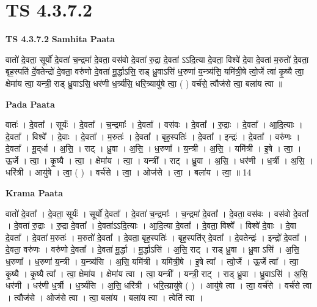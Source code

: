\documentclass[17pt]{extarticle}
\begin{document}
\section{ TS 4.3.7.2 }

\textbf{TS 4.3.7.2 } \newline
\textbf{Samhita Paata} \newline

वातो॑ दे॒वता॒ सूर्यो॑ दे॒वता॑ च॒न्द्रमा॑ दे॒वता॒ वस॑वो दे॒वता॑ रु॒द्रा दे॒वता॑ ऽऽदि॒त्या दे॒वता॒ विश्वे॑ दे॒वा दे॒वता॑ म॒रुतो॑ दे॒वता॒ बृह॒स्पति॑ र्दे॒वतेन्द्रो॑ दे॒वता॒ वरु॑णो दे॒वता॑ मू॒र्द्धाऽसि॒ राड् ध्रु॒वाऽसि॑ ध॒रुणा॑ य॒न्त्र्य॑सि॒ यमि॑त्री॒षे त्वो॒र्जे त्वा॑ कृ॒ष्यै त्वा॒ क्षेमा॑य त्वा॒ यन्त्री॒ राड् ध्रु॒वाऽसि॒ धर॑णी ध॒र्त्र्य॑सि॒ धरि॒त्र्यायु॑षे त्वा॒ ( ) वर्च॑से॒ त्वौज॑से त्वा॒ बला॑य त्वा ॥ \newline

\textbf{Pada Paata} \newline

वातः॑ । दे॒वता᳚ । सूर्यः॑ । दे॒वता᳚ । च॒न्द्रमाः᳚ । दे॒वता᳚ । वस॑वः । दे॒वता᳚ । रु॒द्राः । दे॒वता᳚ । आ॒दि॒त्याः । दे॒वता᳚ । विश्वे᳚ । दे॒वाः । दे॒वता᳚ । म॒रुतः॑ । दे॒वता᳚ । बृह॒स्पतिः॑ । दे॒वता᳚ । इन्द्रः॑ । दे॒वता᳚ । वरु॑णः । दे॒वता᳚ । मू॒द्‌र्धा । अ॒सि॒ । राट् । ध्रु॒वा । अ॒सि॒ । ध॒रुणा᳚ । य॒न्त्री । अ॒सि॒ । यमि॑त्री । इ॒षे । त्वा॒ । ऊ॒र्जे । त्वा॒ । कृ॒ष्यै । त्वा॒ । क्षेमा॑य । त्वा॒ । यन्त्री᳚ । राट् । ध्रु॒वा । अ॒सि॒ । धर॑णी । ध॒र्त्री । अ॒सि॒ । धरि॑त्री । आयु॑षे । त्वा॒ ( ) । वर्च॑से । त्वा॒ । ओज॑से । त्वा॒ । बला॑य । त्वा॒ ॥ 14  \newline


\textbf{Krama Paata} \newline

वातो॑ दे॒वता᳚ । दे॒वता॒ सूर्यः॑ । सूर्यो॑ दे॒वता᳚ । दे॒वता॑ च॒न्द्रमाः᳚ । च॒न्द्रमा॑ दे॒वता᳚ । दे॒वता॒ वस॑वः । वस॑वो दे॒वता᳚ । दे॒वता॑ रु॒द्राः । रु॒द्रा दे॒वता᳚ । दे॒वता॑ऽऽदि॒त्याः । आ॒दि॒त्या दे॒वता᳚ । दे॒वता॒ विश्वे᳚ । विश्वे॑ दे॒वाः । दे॒वा दे॒वता᳚ । दे॒वता॑ म॒रुतः॑ । म॒रुतो॑ दे॒वता᳚ । दे॒वता॒ बृह॒स्पतिः॑ । बृह॒स्पति॑र् दे॒वता᳚ । दे॒वतेन्द्रः॑ । इन्द्रो॑ दे॒वता᳚ । दे॒वता॒ वरु॑णः । वरु॑णो दे॒वता᳚ । दे॒वता॑ मू॒र्द्धा । मू॒र्द्धाऽसि॑ । अ॒सि॒ राट् । राड् ध्रु॒वा । ध्रु॒वा ऽसि॑ । अ॒सि॒ ध॒रुणा᳚ । ध॒रुणा॑ य॒न्त्री । य॒न्त्र्य॑सि । अ॒सि॒ यमि॑त्री । यमि॑त्री॒षे । इ॒षे त्वा᳚ । त्वो॒र्जे । ऊ॒र्जे त्वा᳚ । त्वा॒ कृ॒ष्यै । कृ॒ष्यै त्वा᳚ । त्वा॒ क्षेमा॑य । क्षेमा॑य त्वा । त्वा॒ यन्त्री᳚ । यन्त्री॒ राट् । राड् ध्रु॒वा । ध्रु॒वाऽसि॑ । अ॒सि॒ धर॑णी । धर॑णी ध॒र्त्री । ध॒र्त्र्य॑सि । अ॒सि॒ धरि॑त्री । धरि॒त्य्रायु॑षे ( ) । आयु॑षे त्वा । त्वा॒ वर्च॑से । वर्च॑से त्वा । त्वौज॑से । ओज॑से त्वा । त्वा॒ बला॑य । बला॑य त्वा । त्वेति॑ त्वा । \newline
\end{document}
